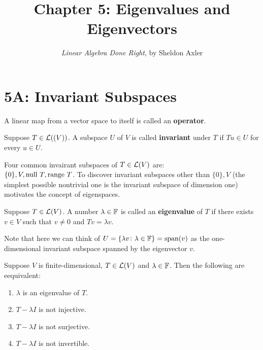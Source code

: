 \documentclass{extarticle}
\title{\vspace{-2em}Chapter 5: Eigenvalues and Eigenvectors}
\author{\emph{Linear Algebra Done Right}, by Sheldon Axler}
\date{}
\begin{document}
\maketitle 
\tableofcontents

\newpage 


\section*{5A: Invariant Subspaces}

\begin{definition}[operator]
    A linear map from a vector space to itself is called an \textbf{operator}. 
\end{definition}

\begin{definition}
    Suppose \(T \in \mathcal{L}((V))\). A subspace \(U\) of \(V\) is called \textbf{invariant}
    under \(T\) if \(Tu \in U\) for every \(u \in U\).
\end{definition}

\begin{remark}
    Four common invairant subspaces of \(T \in \mathcal{L}(V)\) are: \\ 
    \(\{0\}, V, \text{null } T, \text{range } T\). To discover invariant subspaces 
    other than \(\{0\}, V\) (the simplest possible nontrivial 
    one is the invariant subspace of dimension one) 
    motivates the concept 
    of eigenspaces. 
\end{remark}


\begin{definition}[eigenvalue]
    Suppose \(T \in \mathcal{L}(V)\). A number \(\lambda \in \mathbb{F}\) is called an \textbf{eigenvalue}
    of \(T\) if there exists \(v \in V\) such that \(v \neq 0\) and \(Tv=\lambda v\). 
\end{definition}

\begin{remark}
    Note that here we can think of \(U = \{\lambda v \colon \lambda \in \mathbb{F}\} = \text{span}(v)\)
    as the one-dimensional invariant subspace spanned by the eigenvector \(v\). 
\end{remark}


\begin{lemma}
    Suppose \(V\) is finite-dimensional, \(T \in \mathcal{L}(V)\) and \(\lambda \in \mathbb{F}\). Then 
    the following are eequivalent:
    \begin{enumerate}[label=(\alph*)]
        \item \(\lambda\) is an eigenvalue of \(T\).
        \item \(T - \lambda I\) is not injective. 
        \item \(T - \lambda I\) is not surjective. 
        \item \(T - \lambda I\) is not invertible. 
    \end{enumerate}
\end{lemma}
\end{document}
